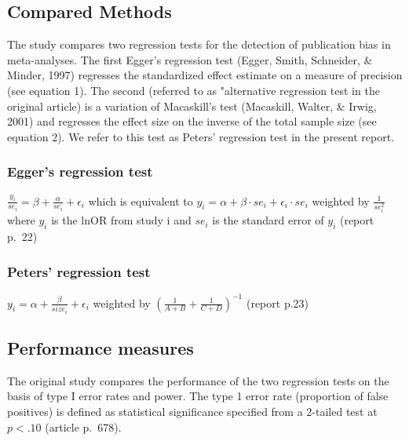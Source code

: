 \documentclass[
  english,
  doc,floatsintext,draftall]{apa6}
\begin{document}
\hypertarget{compared-methods}{%
\subsection{Compared Methods}\label{compared-methods}}

The study compares two regression tests for the detection of publication bias in meta-analyses.
The first Egger's regression test (Egger, Smith, Schneider, \& Minder, 1997) regresses the standardized effect estimate on a measure of precision (see equation 1).
The second (referred to as "alternative regression test in the original article) is a variation of Macaskill's test (Macaskill, Walter, \& Irwig, 2001) and regresses the effect size on the inverse of the total sample size (see equation 2).
We refer to this test as Peters' regression test in the present report.

\hypertarget{eggers-regression-test}{%
\subsubsection{Egger's regression test}\label{eggers-regression-test}}

\(\frac{y_i}{se_i}= \beta + \frac{\alpha}{se_i}+\epsilon_i\) which is equivalent to
\(y_i = \alpha +\beta \cdot se_i +\epsilon_i \cdot se_i\) weighted by \(\frac{1}{se_i^2}\)
where \(y_i\) is the lnOR from study i and \(se_i\) is the standard error of \(y_i\)
(report p.~22)

\hypertarget{peters-regression-test}{%
\subsubsection{Peters' regression test}\label{peters-regression-test}}

\(y_i = \alpha +\frac{\beta}{size_i} + \epsilon_i\) weighted by \((\frac{1}{A+B}+\frac{1}{C+D})^{-1}\)
(report p.23)

\hypertarget{performance-measures}{%
\subsection{Performance measures}\label{performance-measures}}

The original study compares the performance of the two regression tests on the basis of type I error rates and power.
The type 1 error rate (proportion of false positives) is defined as statistical significance specified from a 2-tailed test at \(p<.10\) (article p.~678).
\end{document}
